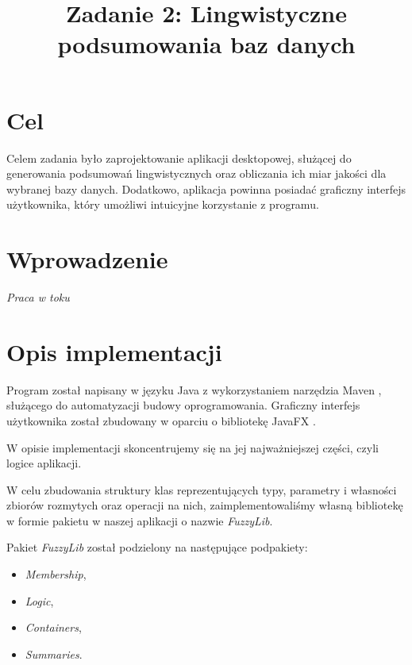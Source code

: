 \documentclass{classrep}
\author{
\studentinfo{Mateusz Walczak}{216911} \and
\studentinfo{Konrad Kajszczak}{216790}
}
\title{Zadanie 2: Lingwistyczne podsumowania baz danych}
\begin{document}
\maketitle

\section{Cel}
Celem zadania było zaprojektowanie aplikacji desktopowej, służącej do generowania podsumowań lingwistycznych oraz obliczania ich miar jakości dla wybranej bazy danych. Dodatkowo, aplikacja powinna posiadać graficzny interfejs użytkownika, który umożliwi intuicyjne korzystanie z programu.



\section{Wprowadzenie}
\textit{Praca w toku}



\section{Opis implementacji}

Program został napisany w języku Java z wykorzystaniem narzędzia Maven \cite{Maven}, służącego do automatyzacji budowy oprogramowania. Graficzny interfejs użytkownika został zbudowany w oparciu o bibliotekę JavaFX \cite{FX}.\newline

W opisie implementacji skoncentrujemy się na jej najważniejszej części, czyli logice aplikacji.\newline 

W celu zbudowania struktury klas reprezentujących typy, parametry i własności zbiorów rozmytych oraz operacji na nich, zaimplementowaliśmy własną bibliotekę w formie pakietu w naszej aplikacji o nazwie \textit{FuzzyLib}.\newline

Pakiet \textit{FuzzyLib} został podzielony na następujące podpakiety:
\begin{itemize}[label=$\bullet$\scshape\bfseries]
\item  \textit{Membership},
\item  \textit{Logic},
\item  \textit{Containers},
\item  \textit{Summaries}.
\end{itemize}
\end{document}
